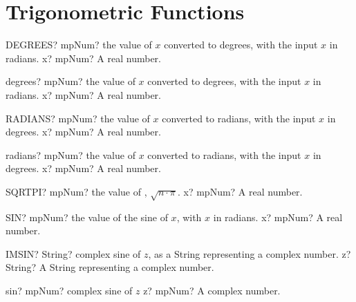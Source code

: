 \documentclass[12pt,a4paper,openany]{book}
\begin{document}
\section{Trigonometric Functions}

\begin{mpFunctionsExtract}
\mpWorksheetFunctionOneNotImplemented
{DEGREES? mpNum? the value of $x$ converted to degrees, with the input $x$ in radians.}
{x? mpNum? A real number.}
\end{mpFunctionsExtract}

\begin{mpFunctionsExtract}
\mpFunctionOne
{degrees? mpNum? the value of $x$ converted to degrees, with the input $x$ in radians.}
{x? mpNum? A real number.}
\end{mpFunctionsExtract}

\begin{mpFunctionsExtract}
\mpWorksheetFunctionOneNotImplemented
{RADIANS? mpNum? the value of $x$ converted to radians, with the input $x$ in degrees.}
{x? mpNum? A real number.}
\end{mpFunctionsExtract}

\begin{mpFunctionsExtract}
\mpFunctionOne
{radians? mpNum? the value of $x$ converted to radians, with the input $x$ in degrees.}
{x? mpNum? A real number.}
\end{mpFunctionsExtract}

\begin{mpFunctionsExtract}
\mpWorksheetFunctionOneNotImplemented
{SQRTPI? mpNum? the value of , $\sqrt{n \cdot \pi}$.}
{x? mpNum? A real number.}
\end{mpFunctionsExtract}

\begin{mpFunctionsExtract}
\mpWorksheetFunctionOneNotImplemented
{SIN? mpNum? the value of the sine of $x$, with $x$ in radians.}
{x? mpNum? A real number.}
\end{mpFunctionsExtract}

\begin{mpFunctionsExtract}
\mpWorksheetFunctionOneNotImplemented
{IMSIN? String? complex sine of $z$, as a String representing a complex number.}
{z? String? A String representing a complex number.}
\end{mpFunctionsExtract}

\begin{mpFunctionsExtract}
\mpFunctionOne
{sin? mpNum? complex sine of $z$}
{z? mpNum? A complex number.}
\end{mpFunctionsExtract}
\end{document}
